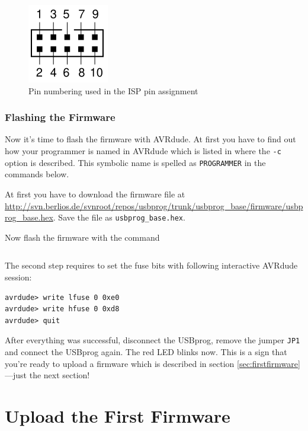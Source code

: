 \documentclass[bibtotoc,UKenglish,halfparskip,oneside,DIV12]{scrreprt}
\begin{document}
\begin{figure}[tb]
  \centering
  \includegraphics{images/isp}
  \caption{Pin numbering used in the ISP pin assignment}
  \label{fig:isp}
\end{figure}

\subsubsection{Flashing the Firmware}

Now it's time to flash the firmware with AVRdude. At first you have to find out how your programmer
is named in AVRdude which is listed in \cite{AVRdude} where the \texttt{-c} option is described.
This symbolic name is spelled as \texttt{PROGRAMMER} in the commands below.

At first you have to download the firmware file at
\url{http://svn.berlios.de/svnroot/repos/usbprog/trunk/usbprog\_base/firmware/usbprog\_base.hex}.
Save the file as \texttt{usbprog\_base.hex}.

Now flash the firmware with the command

\begin{lstlisting}[style=inline]
% avrdude -p m32 -c PROGRAMMER -U flash:w:usbprog_base.hex
\end{lstlisting}

The second step requires to set the fuse bits with following interactive AVRdude session:

\begin{lstlisting}[style=inline]
% avrdude -p m32 -c PROGRAMMER -t
avrdude> write lfuse 0 0xe0
avrdude> write hfuse 0 0xd8
avrdude> quit
\end{lstlisting}

After everything was successful, disconnect the USBprog, remove the jumper \texttt{JP1} and connect
the USBprog again. The red LED blinks now. This is a sign that you're ready to upload a firmware
which is described in section \vref{sec:firstfirmware}---just the next section!

\section{Upload the First Firmware}
\label{sec:firstfirmware}
\end{document}
